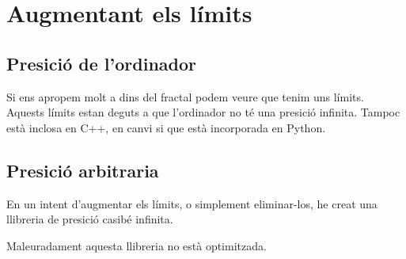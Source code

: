 \section{Augmentant els límits}

\subsection{Presició de l'ordinador}
Si ens apropem molt a dins del fractal podem veure que tenim uns límits. Aquests límits estan deguts a que l'ordinador no té una presició infinita. Tampoc està inclosa en C++, en canvi si que està incorporada en Python.


\subsection{Presició arbitraria}
En un intent d'augmentar els límits, o simplement eliminar-los, he creat una llibreria de presició casibé infinita.

Maleuradament aquesta llibreria no està optimitzada.

